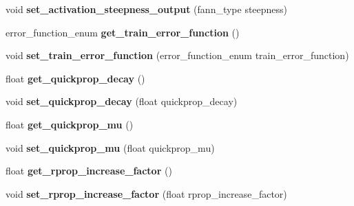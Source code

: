 \begin{DoxyCompactItemize}
\item 
\hypertarget{class_f_a_n_n_1_1neural__net_a3786b596e2581a3a03300dbffc107c5d}{void {\bfseries set\-\_\-activation\-\_\-steepness\-\_\-output} (fann\-\_\-type steepness)}\label{class_f_a_n_n_1_1neural__net_a3786b596e2581a3a03300dbffc107c5d}

\item 
\hypertarget{class_f_a_n_n_1_1neural__net_a11bd26afaff1367980ab96dc88c43b04}{error\-\_\-function\-\_\-enum {\bfseries get\-\_\-train\-\_\-error\-\_\-function} ()}\label{class_f_a_n_n_1_1neural__net_a11bd26afaff1367980ab96dc88c43b04}

\item 
\hypertarget{class_f_a_n_n_1_1neural__net_a8c8062fdc834bc93c0272585a4419757}{void {\bfseries set\-\_\-train\-\_\-error\-\_\-function} (error\-\_\-function\-\_\-enum train\-\_\-error\-\_\-function)}\label{class_f_a_n_n_1_1neural__net_a8c8062fdc834bc93c0272585a4419757}

\item 
\hypertarget{class_f_a_n_n_1_1neural__net_a3c4a1e3289a790e8e2f8dcbedf20fe61}{float {\bfseries get\-\_\-quickprop\-\_\-decay} ()}\label{class_f_a_n_n_1_1neural__net_a3c4a1e3289a790e8e2f8dcbedf20fe61}

\item 
\hypertarget{class_f_a_n_n_1_1neural__net_a42a2c4ff651d0baf76ef611afb0384d4}{void {\bfseries set\-\_\-quickprop\-\_\-decay} (float quickprop\-\_\-decay)}\label{class_f_a_n_n_1_1neural__net_a42a2c4ff651d0baf76ef611afb0384d4}

\item 
\hypertarget{class_f_a_n_n_1_1neural__net_a2612e82791ede59c4c67c31d2a3de843}{float {\bfseries get\-\_\-quickprop\-\_\-mu} ()}\label{class_f_a_n_n_1_1neural__net_a2612e82791ede59c4c67c31d2a3de843}

\item 
\hypertarget{class_f_a_n_n_1_1neural__net_a5002ede10bb23240132dad8e4d5f5a6b}{void {\bfseries set\-\_\-quickprop\-\_\-mu} (float quickprop\-\_\-mu)}\label{class_f_a_n_n_1_1neural__net_a5002ede10bb23240132dad8e4d5f5a6b}

\item 
\hypertarget{class_f_a_n_n_1_1neural__net_ad8990f3425b2f1e75e323184e77aaae4}{float {\bfseries get\-\_\-rprop\-\_\-increase\-\_\-factor} ()}\label{class_f_a_n_n_1_1neural__net_ad8990f3425b2f1e75e323184e77aaae4}

\item 
\hypertarget{class_f_a_n_n_1_1neural__net_abea0de63786b91b6a50a2b3ec1db7f7d}{void {\bfseries set\-\_\-rprop\-\_\-increase\-\_\-factor} (float rprop\-\_\-increase\-\_\-factor)}\label{class_f_a_n_n_1_1neural__net_abea0de63786b91b6a50a2b3ec1db7f7d}


\end{DoxyCompactItemize}
